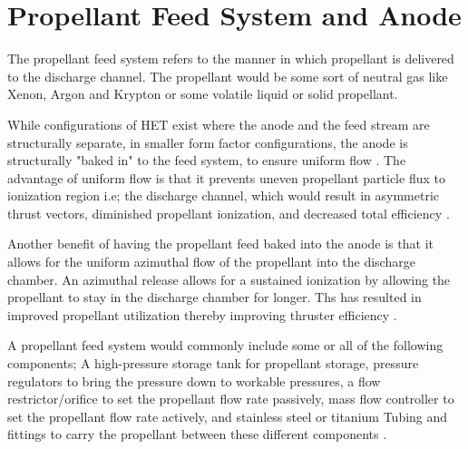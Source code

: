 \section{Propellant Feed System and Anode}



The propellant feed system refers to the manner in which propellant is delivered to the discharge channel. The propellant would be some sort of neutral gas like Xenon, Argon and Krypton or some volatile liquid or solid propellant.


While configurations of \ac{HET} exist where the anode and the feed stream are structurally separate, in smaller form factor configurations, the anode is structurally "baked in" to the feed system, to ensure uniform flow \cite{propfeedsys}. The advantage of uniform flow is that it prevents uneven propellant particle flux to ionization region i.e; the discharge channel, which would result in asymmetric thrust vectors, diminished propellant ionization, and decreased total efficiency \cite{propfeedsys}.


Another benefit of having the propellant feed baked into the anode is that it allows for the uniform azimuthal flow of the propellant into the discharge chamber. An azimuthal release allows for a sustained ionization by allowing the propellant to stay in the discharge chamber for longer. Ths has resulted in improved propellant utilization thereby improving thruster efficiency \cite{propfeedsys}.



A propellant feed system would commonly include some or all of the following components; A high-pressure storage tank for propellant storage, pressure regulators to bring the pressure down to workable pressures, a flow restrictor/orifice to set the propellant flow rate passively, mass flow controller to set the propellant flow rate actively, and stainless steel or titanium Tubing and fittings to carry the propellant between these different components \cite{propfeedsys}. 
